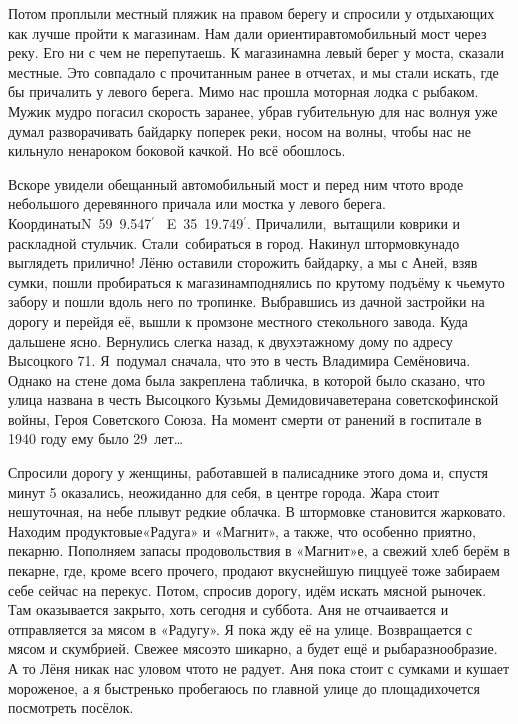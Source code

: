 Потом проплыли местный пляжик на правом берегу и спросили у отдыхающих как лучше пройти к магазинам. Нам дали ориентир\mdash автомобильный мост через реку. Его ни с чем не перепутаешь. К магазинам\mdash на левый берег у моста, сказали местные. Это совпадало с прочитанным ранее в отчетах, и мы стали искать, где бы причалить у левого берега. Мимо нас прошла моторная лодка с рыбаком. Мужик мудро погасил скорость заранее, убрав губительную для нас волну\mdash я уже думал разворачивать байдарку поперек реки, носом на волны, чтобы нас не кильнуло ненароком боковой качкой. Но всё обошлось. 

Вскоре увидели обещанный автомобильный мост и перед ним что\sdash то вроде небольшого деревянного причала или мостка у левого берега. Координаты\mdash N~59\degree~9.547$^\prime$~ E~35\degree~19.749$^\prime$. Причалили,~вытащили коврики и раскладной стульчик. Стали~собираться в город. Накинул штормовку\mdash надо выглядеть прилично! Лёню оставили сторожить байдарку, а мы с Аней, взяв сумки, пошли пробираться к магазинам\mdash поднялись по крутому подъёму к чьему\sdash то забору и пошли вдоль него по тропинке. Выбравшись из дачной застройки на дорогу и перейдя её, вышли к промзоне местного стекольного завода. Куда дальше\mdash не ясно. Вернулись слегка назад, к двухэтажному дому по адресу Высоцкого 71. Я~подумал сначала, что это в честь Владимира Семёновича. Однако на стене дома была закреплена табличка, в которой было сказано, что улица названа в честь Высоцкого Кузьмы Демидовича\mdash ветерана советско\sdash финской войны, Героя Советского Союза. На момент смерти от ранений в госпитале в 1940 году ему было 29~лет\ldots 

Спросили дорогу у женщины, работавшей в палисаднике этого дома и, спустя минут 5 оказались, неожиданно для себя, в центре города. Жара стоит нешуточная, на небе плывут редкие облачка. В штормовке становится жарковато. Находим продуктовые\mdash «Радуга» и «Магнит», а также, что особенно приятно, пекарню. Пополняем запасы продовольствия в «Магнит»\sdash е, а свежий хлеб берём в пекарне, где, кроме всего прочего, продают вкуснейшую пиццу\mdash её тоже забираем себе сейчас на перекус. Потом, спросив дорогу, идём искать мясной рыночек. Там оказывается закрыто, хоть сегодня и суббота. Аня не отчаивается и отправляется за мясом в «Радугу». Я пока жду её на улице. Возвращается с мясом и скумбрией. Свежее мясо\mdash это шикарно, а будет ещё и рыба\mdash разнообразие. А то Лёня никак нас уловом что\sdash то не радует. Аня пока стоит с сумками и кушает мороженое, а я быстренько пробегаюсь по главной улице до площади\mdash хочется посмотреть посёлок.

